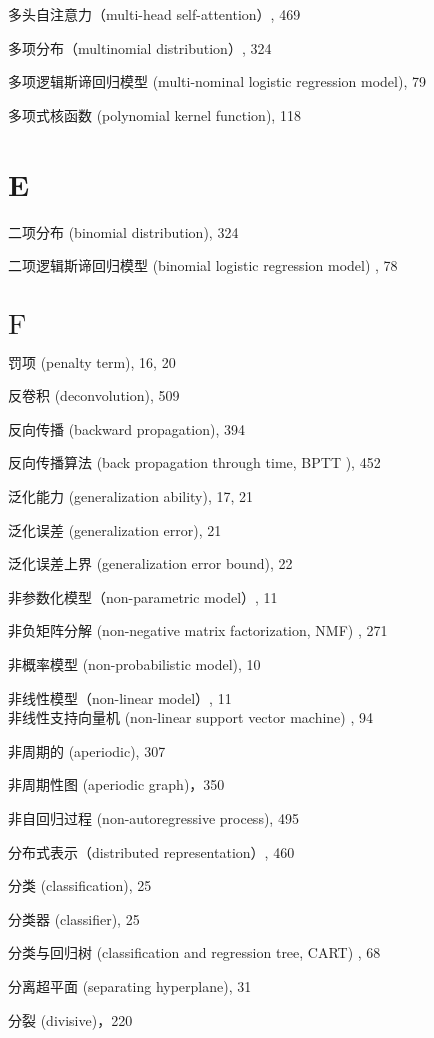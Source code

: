 \documentclass[10pt]{article}
\begin{document}
多头自注意力（multi-head self-attention）, 469

多项分布（multinomial distribution）, 324

多项逻辑斯谛回归模型 (multi-nominal logistic regression model), 79

多项式核函数 (polynomial kernel function), 118

\section*{E}
二项分布 (binomial distribution), 324

二项逻辑斯谛回归模型 (binomial logistic regression model) , 78

\section*{$\mathrm{F}$}
罚项 (penalty term), 16, 20

反卷积 (deconvolution), 509

反向传播 (backward propagation), 394

反向传播算法 (back propagation through time, BPTT ), 452

泛化能力 (generalization ability), 17, 21

泛化误差 (generalization error), 21

泛化误差上界 (generalization error bound), 22

非参数化模型（non-parametric model）, 11

非负矩阵分解 (non-negative matrix factorization, NMF) , 271

非概率模型 (non-probabilistic model), 10

非线性模型（non-linear model）, 11\\
非线性支持向量机 (non-linear support vector machine) , 94

非周期的 (aperiodic), 307

非周期性图 (aperiodic graph)，350

非自回归过程 (non-autoregressive process), 495

分布式表示（distributed representation）, 460

分类 (classification), 25

分类器 (classifier), 25

分类与回归树 (classification and regression tree, CART) , 68

分离超平面 (separating hyperplane), 31

分裂 (divisive)，220
\end{document}
